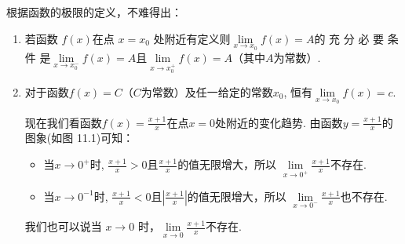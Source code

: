 根据函数的极限的定义，不难得出：
\begin{enumerate}
    \item 若函数 $f(x)$在点 $x=x_0$ 处附近有定义则$\lim\limits_{x\to x_{0}}f(x)=A$的 充 分 必 要 条 件 是$\lim\limits _{x\to x^-_0 }f( x) = A$且$\lim\limits_{x\to x^+_0}f(x)=A$（其中$A$为常数）.
    \item 对于函数$f(x)=C$（$C$为常数）及任一给定的常数$x_0$, 恒有$\lim\limits_{x\to x_0}f(x)=c$.
    
现在我们看函数$f(x)=\frac{x+1}{x}$在点$x=0$处附近的变化趋势. 由函数$y=\frac{x+1}{x}$的图象(如图 11.1)可知：
\begin{itemize}
\item 当$x\to0^{+}$时, $\frac{x+1}x>0$且$\frac{x+1}x$的值无限增大，所以
$\lim\limits_{x\to0^+}\frac{x+1}x$不存在.
\item 
当$x\to0^{-1}$时, $\frac{x+1}x<0$且$\left|\frac{x+1}x\right|$的值无限增大，所以
$\lim\limits_{x\to0^-}\frac{x+1}x$也不存在.
\end{itemize}
我们也可以说当 $x\to0$ 时，$\lim\limits_{x\to0}\frac{x+1}x$不存在.
\end{enumerate}


